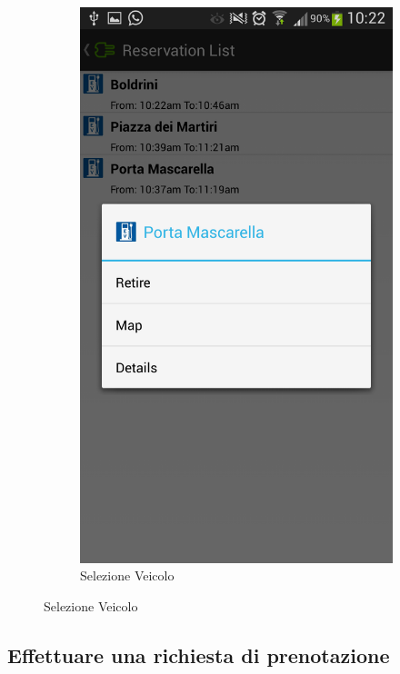 \begin{figure}
\begin{subfigure}{0.45\textwidth}
		\includegraphics[width=\textwidth]{assets/mobile-app-reservation.png}
		\caption{Selezione Veicolo}
		\label{fig:reservation}
    \end{subfigure}
\end{figure}

\subsection{Effettuare una richiesta di prenotazione}

